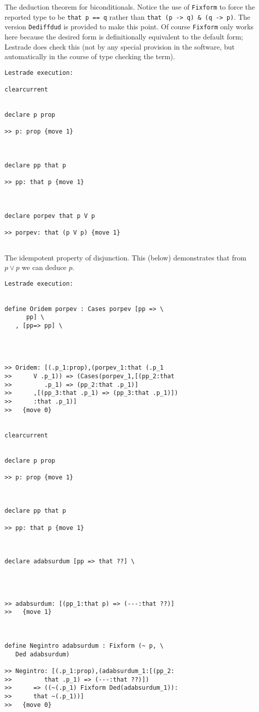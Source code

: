 \documentclass[12pt]{article}
\begin{document}
The deduction theorem for biconditionals.  Notice the use of {\tt Fixform} to force the reported type to be {\tt that p == q} rather than {\tt that (p -> q) \& (q -> p)}.  The version {\tt Dediffdud} is provided to make this point. 
 Of course {\tt Fixform} only works here because the desired form is definitionally equivalent to the default form;  Lestrade does check this (not by any special provision in the software, but automatically in the course of type checking the term).

\begin{verbatim}Lestrade execution:

clearcurrent


declare p prop

>> p: prop {move 1}



declare pp that p

>> pp: that p {move 1}



declare porpev that p V p

>> porpev: that (p V p) {move 1}


\end{verbatim}

The idempotent property of disjunction.  This (below) demonstrates that from $p \vee p$ we can deduce $p$.

\begin{verbatim}Lestrade execution:


define Oridem porpev : Cases porpev [pp => \
      pp] \
   , [pp=> pp] \
   



>> Oridem: [(.p_1:prop),(porpev_1:that (.p_1
>>      V .p_1)) => (Cases(porpev_1,[(pp_2:that
>>         .p_1) => (pp_2:that .p_1)]
>>      ,[(pp_3:that .p_1) => (pp_3:that .p_1)])
>>      :that .p_1)]
>>   {move 0}


clearcurrent


declare p prop

>> p: prop {move 1}



declare pp that p

>> pp: that p {move 1}



declare adabsurdum [pp => that ??] \
   



>> adabsurdum: [(pp_1:that p) => (---:that ??)]
>>   {move 1}



define Negintro adabsurdum : Fixform (~ p, \
   Ded adabsurdum)

>> Negintro: [(.p_1:prop),(adabsurdum_1:[(pp_2:
>>         that .p_1) => (---:that ??)])
>>      => ((~(.p_1) Fixform Ded(adabsurdum_1)):
>>      that ~(.p_1))]
>>   {move 0}


\end{verbatim}
\end{document}
